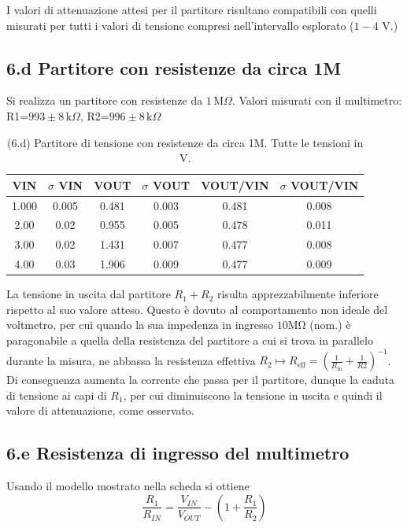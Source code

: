 \documentclass[10pt,a4paper]{article}
\begin{document}
I valori di attenuazione attesi per il partitore risultano compatibili
con quelli misurati per tutti i valori di tensione compresi nell'intervallo
esplorato ($1 - 4$ V.)

\subsection*{6.d Partitore con resistenze da circa 1M}
\par
Si realizza un partitore con resistenze da $1 \,\mathrm{M}\Omega$.
Valori misurati con il multimetro: R1=$993 \pm 8 \,\mathrm{k}\Omega$,
R2=$996 \pm 8 \,\mathrm{k}\Omega$


\begin{table}[h]
\centering
\begin{tabular}{|c|c|c|c|c|c|}
\hline 
VIN& $\sigma$ VIN  &VOUT	 & $\sigma$ VOUT& VOUT/VIN & $\sigma$ VOUT/VIN \\
\hline 
1.000 & 0.005 & 0.481 & 0.003 & 0.481 & 0.008 \\
2.00 & 0.02 & 0.955 & 0.005 & 0.478 & 0.011 \\
3.00 & 0.02 & 1.431 & 0.007 & 0.477 & 0.008 \\
4.00 & 0.03 & 1.906 & 0.009 & 0.477 & 0.009 \\
\hline 
\end{tabular} 
\caption{(6.d) Partitore di tensione con resistenze da circa 1M.
Tutte le tensioni in V.\label{tab:div1M}}
\end{table}

La tensione in uscita dal partitore $R_1 + R_2$ risulta apprezzabilmente
inferiore rispetto al suo valore atteso. Questo è dovuto al comportamento
non ideale del voltmetro, per cui quando la sua impedenza in ingresso
$10 \si{\Mohm}$ (nom.) è paragonabile a quella della resistenza del partitore
a cui si trova in parallelo durante la misura, ne abbassa la resistenza
effettiva $R_2 \mapsto R_{\mathrm{eff}} = (\frac{1}{R_{\mathrm{in}}}
+ \frac{1}{R2})^{-1}$. Di conseguenza aumenta la corrente che passa per
il partitore, dunque la caduta di tensione ai capi di $R_1$, per cui
diminuiscono la tensione in uscita e quindi il valore di attenuazione, come
osservato.


\subsection*{6.e Resistenza di ingresso del multimetro}
Usando il modello mostrato nella scheda si ottiene
\begin{equation}\label{eq: divider}
\frac{R_1}{R_{IN}} =  \frac{V_{IN}}{V_{OUT}} - (1 +  \frac{R_1}{R_2} )
\end{equation}
\end{document}
